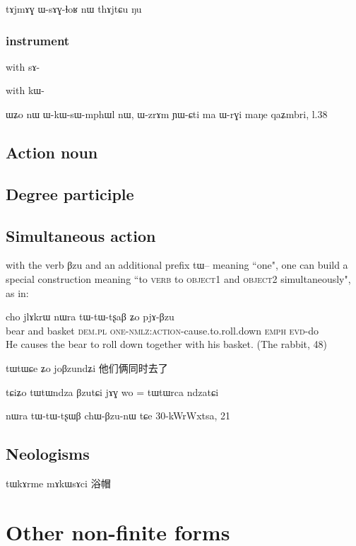\documentclass[oldfontcommands,oneside,a4paper,11pt]{memoir}
\newcommand{\ipa}[1]{{\phon #1}} %
\newcommand{\wav}[1]{}%
\begin{document}
tɤjmɤɣ ɯ-sɤɣ-ɬoʁ nɯ thɤjtɕu ŋu

\subsubsection{instrument} 
with sɤ-



with kɯ-


ɯʑo nɯ  ɯ-kɯ-sɯ-mphɯl nɯ, ɯ-zrɤm ɲɯ-ɕti ma ɯ-rɣi maŋe
qaʑmbri, l.38


\subsection{Action noun} \label{sub:action.noun}
\subsection{Degree participle} \label{sub:degree.part}

\subsection{Simultaneous action} \label{sub:simult.part}

  with the verb \ipa{βzu}  and an additional prefix \ipa{tɯ}-- meaning ``one", one can build a special construction meaning ``to \textsc{verb} to \textsc{object1} and \textsc{object2} simultaneously", as in:
 

   \begin{exe} %
\ex
\gll  \ipa{pri} \ipa{cho} \ipa{jlɤkrɯ} \ipa{nɯra} \ipa{tɯ-tɯ-tʂaβ} \ipa{ʑo} \ipa{pjɤ-βzu} \\
  bear and basket \textsc{dem.pl}  \textsc{one-nmlz:action}-cause.to.roll.down \textsc{emph} \textsc{evd}-do \\
 \glt  He causes the bear to roll down together with his basket. (The rabbit, 48)
\end{exe} 

tɯtɯɕe ʑo joβzundʑi
他们俩同时去了

tɕiʑo tɯtɯndza βzutɕi jɤɣ wo = tɯtɯrca ndzatɕi
\wav{8_simult}

nɯra tɯ-tɯ-tʂɯβ chɯ-βzu-nɯ tɕe
30-kWrWxtsa, 21
\subsection{Neologisms}

tɯkɤrme mɤkɯsɤci 浴帽
\section{Other non-finite forms} \label{sec:non.finite}
\end{document}
